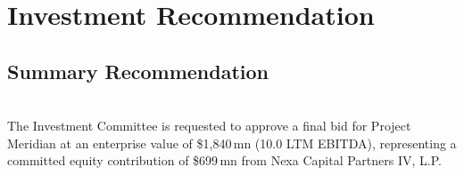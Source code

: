 
\section{Investment Recommendation}

\subsection{Summary Recommendation}

\begin{tcolorbox}[
  enhanced, sharp corners,
  colback=NavyDark, colframe=NavyDark,
  left=12pt, right=12pt, top=10pt, bottom=10pt
]
  \centering
  \color{white}{\large\bfseries RECOMMEND PROCEEDING TO FINAL OFFER}\\[6pt]
  \color{IceBlue}\normalsize
  The Investment Committee is requested to approve a final bid for Project Meridian at an
  enterprise value of \$1,840\,mn (10.0\texttimes{} LTM EBITDA), representing a committed
  equity contribution of \$699\,mn from Nexa Capital Partners IV, L.P.
\end{tcolorbox}

\vspace{10pt}


